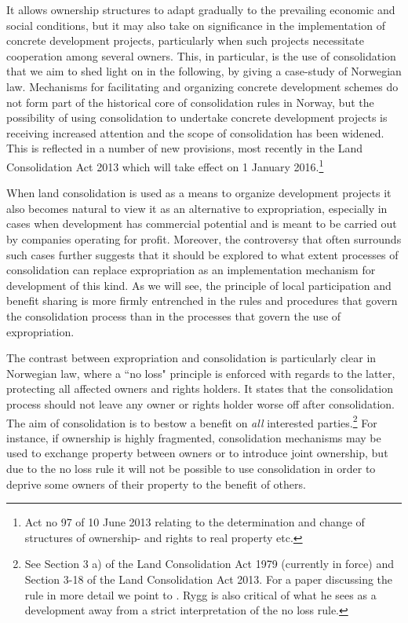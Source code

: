 It allows ownership structures to adapt gradually to the prevailing economic and social conditions, but it may also take on significance in the implementation of concrete development projects, particularly when such projects necessitate cooperation among several owners. This, in particular, is the use of consolidation that we aim to shed light on in the following, by giving a case-study of Norwegian law. Mechanisms for facilitating and organizing concrete development schemes do not form part of the historical core of consolidation rules in Norway, but the possibility of using consolidation to undertake concrete development projects is receiving increased attention and the scope of consolidation has been widened. This is reflected in a number of new provisions, most recently in the Land Consolidation Act 2013 which will take effect on 1 January 2016.\footnote{Act no 97 of 10 June 2013 relating to the determination and change of structures of ownership- and rights to real property etc.}

When land consolidation is used as a means to organize development projects it also becomes natural to view it as an alternative to expropriation, especially in cases when development has commercial potential and is meant to be carried out by companies operating for profit. Moreover, the controversy that often surrounds such cases further suggests that it should be explored to what extent processes of consolidation can replace expropriation as an implementation mechanism for development of this kind. As we will see, the principle of local participation and benefit sharing is more firmly entrenched in the rules and procedures that govern the consolidation process than in the processes that govern the use of expropriation. 

The contrast between expropriation and consolidation is particularly clear in Norwegian law, where a ``no loss" principle is enforced with regards to the latter, protecting all affected owners and rights holders. It states that the consolidation process should not leave any owner or rights holder worse off after consolidation. The aim of consolidation is to bestow a benefit on \emph{all} interested parties.\footnote{See Section 3 a) of the Land Consolidation Act 1979 (currently in force) and Section 3-18 of the Land Consolidation Act 2013. For a paper discussing the rule in more detail we point to \cite{rygg1998}. Rygg is also critical of what he sees as a development away from a strict interpretation of the no loss rule.} For instance, if ownership is highly fragmented, consolidation mechanisms may be used to exchange property between owners or to introduce joint ownership, but due to the no loss rule it will not be possible to use consolidation in order to deprive some owners of their property to the benefit of others.


